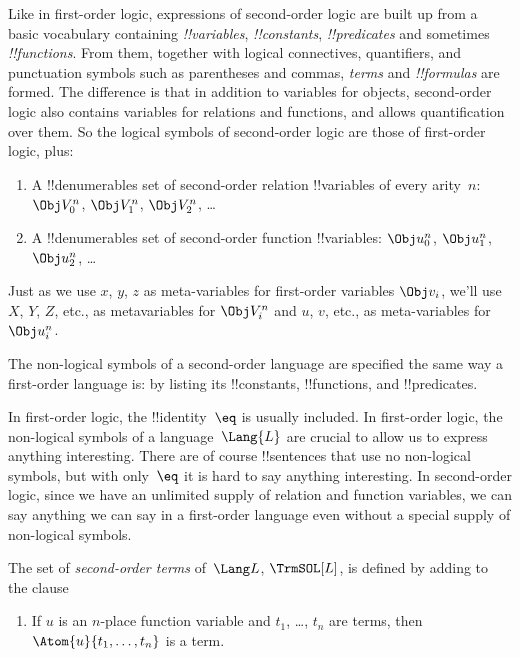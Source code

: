 \documentclass[../../../include/open-logic-section]{subfiles}
\begin{document}

Like in first-order logic, expressions of second-order logic are built
up from a basic vocabulary containing \emph{!!{variable}s},
\emph{!!{constant}s}, \emph{!!{predicate}s} and sometimes
\emph{!!{function}s}.  From them, together with logical connectives,
quantifiers, and punctuation symbols such as parentheses and commas,
\emph{terms} and \emph{!!{formula}s} are formed.  The difference is
that in addition to variables for objects, second-order logic also
contains variables for relations and functions, and allows
quantification over them. So the logical symbols of second-order logic
are those of first-order logic, plus:

\begin{enumerate}
\item A !!{denumerable}s set of second-order relation !!{variable}s of
  every arity~$n$: $\Obj V_0^n$, $\Obj V_1^n$, $\Obj V_2^n$, \dots
\item A !!{denumerable}s set of second-order function !!{variable}s:
  $\Obj u_0^n$, $\Obj u_1^n$, $\Obj u_2^n$, \dots
\end{enumerate}

Just as we use $x$, $y$, $z$ as meta-variables for first-order
variables $\Obj v_i$, we'll use $X$, $Y$, $Z$, etc., as metavariables
for $\Obj V_i^n$ and $u$, $v$, etc., as meta-variables for~$\Obj u_i^n$.

\begin{explain}
The non-logical symbols of a second-order language are specified the
same way a first-order language is: by listing its !!{constant}s,
!!{function}s, and !!{predicate}s.

In first-order logic, the !!{identity}~$\eq$ is usually included. In
first-order logic, the non-logical symbols of a language~$\Lang{L}$
are crucial to allow us to express anything interesting. There are of
course !!{sentence}s that use no non-logical symbols, but with
only~$\eq$ it is hard to say anything interesting.  In second-order
logic, since we have an unlimited supply of relation and function
variables, we can say anything we can say in a first-order language
even without a special supply of non-logical symbols.
\end{explain}

\begin{defn}
The set of \emph{second-order terms} of~$\Lang L$, $\TrmSOL[L]$, is
defined by adding to  the clause
\begin{enumerate}
\item If $u$ is an $n$-place function variable and $t_1$, \dots, $t_n$
  are terms, then $\Atom{u}{t_1, \ldots, t_n}$ is a term.
\end{enumerate}
\end{defn}
\end{document}
